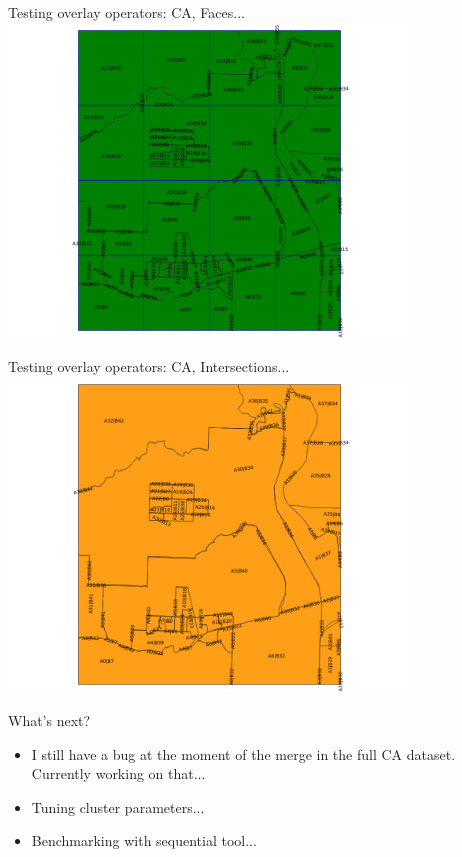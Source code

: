 \documentclass{beamer}
\begin{document}
\begin{frame}{Testing overlay operators: CA, Faces...}
    \centering
	\includegraphics[trim=1cm 0 1cm 0, clip, width=0.8\textwidth]{figures/CA_Faces}
\end{frame}
\begin{frame}{Testing overlay operators: CA, Intersections...}
    \centering
	\includegraphics[trim=1cm 0 1cm 0, clip, width=0.8\textwidth]{figures/CA_Intersections}
\end{frame}

\begin{frame}{What's next?}
    \begin{itemize}
        \item I still have a bug at the moment of the merge in the full CA dataset.  Currently working on that...
        \item Tuning cluster parameters...
        \item Benchmarking with sequential tool...
    \end{itemize}
\end{frame}
\end{document}
